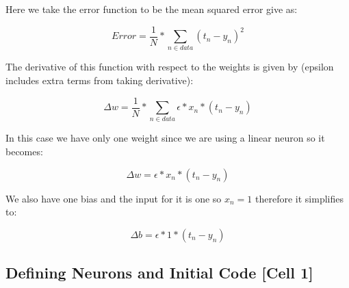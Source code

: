\documentclass[a4paper, 12pt]{article}
\begin{document}
    Here we take the error function to be the mean squared error give as:

    $$Error = \frac{1}{N} * \sum_{n \in data} (t_n - y_n)^2 $$

    The derivative of this function with respect to the weights is given by (epsilon includes extra terms from taking derivative):

    $$\Delta w = \frac{1}{N} * \sum_{n \in data} \epsilon * x_n * (t_n - y_n) $$

    In this case we have only one weight since we are using a linear neuron so it becomes:

    $$\Delta w = \epsilon * x_n * (t_n - y_n) $$

    We also have one bias and the input for it is one so $ x_n = 1 $ therefore it simplifies to:

    $$\Delta b = \epsilon * 1 * (t_n - y_n) $$

    \subsection{Defining Neurons and Initial Code [Cell 1]}
\end{document}
